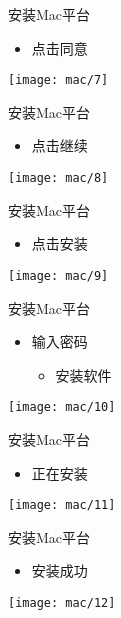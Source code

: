 \documentclass[fontset = none, t]{ctexbeamer}
\begin{document}
\begin{frame}{安装\tl}{Mac平台}
  \begin{itemize}
  \item 点击同意
  \end{itemize}
  \centering
  \vfill
  \texttt{[image: mac/7]}
  \vfill
\end{frame}

\begin{frame}{安装\tl}{Mac平台}
  \begin{itemize}
  \item 点击继续
  \end{itemize}
  \centering
  \vfill
  \texttt{[image: mac/8]}
  \vfill
\end{frame}

\begin{frame}{安装\tl}{Mac平台}
  \begin{itemize}
  \item 点击安装
  \end{itemize}
  \centering
  \vfill
  \texttt{[image: mac/9]}
  \vfill
\end{frame}

\begin{frame}{安装\tl}{Mac平台}
  \begin{itemize}
  \item 输入密码
   \begin{itemize}
      \item 安装软件
      \end{itemize} 
  \end{itemize}
  \centering
  \vfill
  \texttt{[image: mac/10]}
  \vfill
\end{frame}



\begin{frame}{安装\tl}{Mac平台}
  \begin{itemize}
  \item 正在安装
  \end{itemize}
  \centering
  \vfill
  \texttt{[image: mac/11]}
  \vfill
\end{frame}

\begin{frame}{安装\tl}{Mac平台}
  \begin{itemize}
  \item 安装成功
  \end{itemize}
  \centering
  \vfill
  \texttt{[image: mac/12]}
  \vfill
\end{frame}
\end{document}

